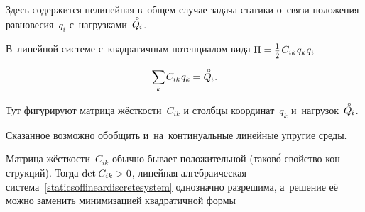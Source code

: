 \begin{otherlanguage}{russian}
\vspace{-0.5em} \noindent Здесь содержится нелинейная в~общем случае задача статики о~связи положения равновесия~$q_i$ с~нагрузками~${\mathcircabove{Q}_{\hspace{-0.1ex}i}}$.

В~линейной системе с~квадратичным потенциалом вида ${\Pi = \smalldisplaystyleonehalf \hspace{.2ex} C_{ik} \hspace{.12ex} q_{k} \hspace{.1ex} q_{i}}$

\nopagebreak\vspace{-1.25em}\begin{equation}\label{staticsoflineardiscretesystem}
\scalebox{0.95}[1]{$\displaystyle \sum_{\smash{k}}$} \hspace{.2ex} C_{ik} \hspace{.12ex} q_k \hspace{-0.1ex}
= \hspace{.1ex} \mathcircabove{Q}_{\hspace{-0.1ex}i} \hspace{.1ex} .
\vspace{-0.1em}\end{equation}

\vspace{-0.2em} \noindent Тут фигурируют матрица жёсткости~$C_{ik}$ и столбцы координат~${q_k}$ и~нагрузок~${\mathcircabove{Q}_{\hspace{-0.1ex}i}}$.

Сказанное возможно обобщить и~на~континуальные линейные упругие среды.

Матрица жёсткости~${C_{ik}}$ обычно бывает положительной (таков\'{о} свойство конструкций). %
Тогда ${\operatorname{det} \hspace{.16ex} C_{ik} > 0}$, линейная алгебраическая система~\eqref{staticsoflineardiscretesystem} однозначно разрешима, а~решение её можно заменить минимизацией квадратичной формы


\end{otherlanguage}
